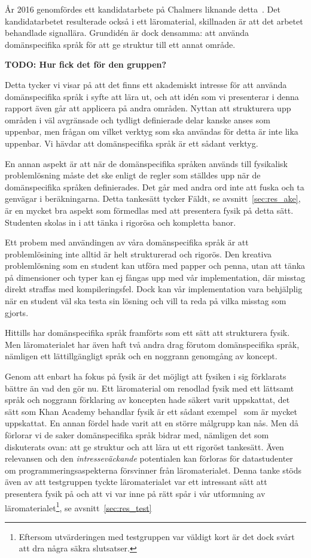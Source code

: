 År 2016 genomfördes ett kandidatarbete på Chalmers liknande
detta~\cite{kandidat2016}. Det kandidatarbetet resulterade också i ett
läromaterial, skillnaden är att det arbetet behandlade signallära. Grundidén är
dock densamma: att använda domänspecifika språk för att ge struktur till ett
annat område.

\textbf{TODO: Hur fick det för den gruppen?}

Detta tycker vi visar på att det finns ett
akademiskt intresse för att använda domänspecifika språk i syfte att lära ut,
och att idén som vi presenterar i denna rapport även går att applicera på
andra områden. Nyttan att strukturera upp områden i väl avgränsade och
tydligt definierade delar kanske anses som uppenbar, men frågan om vilket
verktyg som ska användas för detta är inte lika uppenbar. Vi hävdar att
domänspecifika språk är ett sådant verktyg.

En annan aspekt är att när de domänspecifika språken används till fysikalisk
problemlösning måste det ske enligt de regler som ställdes upp när de
domänspecifika språken definierades. Det går med andra ord inte att fuska och ta
genvägar i beräkningarna. Detta tankesätt tycker Fäldt, se
avsnitt~\ref{sec:res_ake}, är en mycket bra aspekt som förmedlas med att
presentera fysik på detta sätt. Studenten skolas in i att tänka i rigorösa och
kompletta banor.

Ett probem med användingen av våra domänspecifika språk är att problemlösining
inte alltid är helt strukturerad och rigorös. Den kreativa problemlösning som en
student kan utföra med papper och penna, utan att tänka på dimensioner och typer
kan ej fångas upp med vår implementation, där misstag direkt straffas med
kompileringsfel. Dock kan vår implementation vara behjälplig när en student väl
ska testa sin lösning och vill ta reda på vilka misstag som gjorts.

Hittills har domänspecifika språk framförts som ett sätt att strukturera fysik.
Men läromaterialet har även haft två andra drag förutom domänspecifika språk,
nämligen ett lättillgängligt språk och en noggrann genomgång av koncept.

Genom att enbart ha fokus på fysik är det möjligt att fysiken i sig förklarats
bättre än vad den gör nu. Ett läromaterial om renodlad fysik med ett lättsamt
språk och noggrann förklaring av koncepten hade säkert varit uppskattat, det
sätt som Khan Academy behandlar fysik är ett sådant exempel~\cite{khan} som är
mycket uppskattat. En annan fördel hade varit att en större målgrupp kan nås.
Men då förlorar vi de saker domänspecifika språk bidrar med, nämligen det som
diskuterats ovan: att ge struktur och att lära ut ett rigoröst tankesätt.
Även relevansen och den \textit{intresseväckande}
potentialen kan förloras för datastudenter om programmeringsaspekterna
försvinner från läromaterialet. Denna
tanke stöds även av att testgruppen tyckte läromaterialet var ett intressant sätt
att presentera fysik på och att vi var inne på rätt spår i vår utformning av
läromaterialet\footnote{Eftersom utvärderingen med
testgruppen var väldigt kort är det dock svårt att dra några säkra slutsatser.},
se avsnitt~\ref{sec:res_test}

